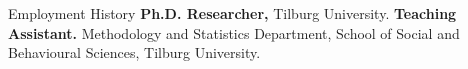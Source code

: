 \begin{rubric}{Employment History}
%
	\textbf{Ph.D. Researcher,} Tilburg University.
%
%
\entry*[2018 -- 2019]%
	\textbf{Teaching Assistant.} Methodology and Statistics Department, School of Social and Behavioural Sciences, Tilburg University.
%
\end{rubric}